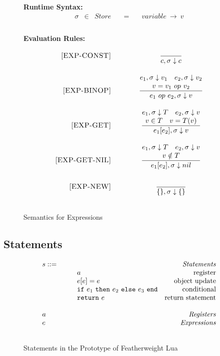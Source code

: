 \documentclass{article}
\begin{document}
\begin{figure}[H]
\caption{Semantics for Expressions}
{\bf Runtime Syntax:}
\label{fig:ExpSem}
\[
\begin{array}{rclcl}
  \sigma & \in & {Store} \quad  & = & \quad {variable} ~\rightarrow ~v \\
  \\
\end{array}
\]

{\bf Evaluation Rules:~~~ } \\
\[
\begin{array}{r@{\qquad\qquad}c}
\ssrule{EXP-CONST}{
}{
  \semanticExp{c}{\sigma}{c}
}
\ssrule{EXP-BINOP}{
  \semanticExp{e_1}{\sigma}{v_1} \quad
  \semanticExp{e_2}{\sigma}{v_2} \\
  v = v_1 ~op~ v_2
}{
  \semanticExp{e_1 ~op~ e_2}{\sigma}{v}
}
\ssrule{EXP-GET}{
  \semanticExp{e_1}{\sigma}{T} \quad
  \semanticExp{e_2}{\sigma}{v} \\
  v \in T \quad
  v = T(v)
}{
  \semanticExp{e_1[e_2]}{\sigma}{v}
}
\ssrule{EXP-GET-NIL}{
  \semanticExp{e_1}{\sigma}{T} \quad
  \semanticExp{e_2}{\sigma}{v} \\
  v \notin T 
}{
  \semanticExp{e_1[e_2]}{\sigma}{nil}
}
\ssrule{EXP-NEW}{
}{
  \semanticExp{\{\}}{\sigma}{\{\}}
}
\end{array}
\]
\end{figure}


\subsection{Statements}



\begin{figure}
\caption{Statements in the Prototype of Featherweight Lua}
\label{fig:FWLuaStat}
\[
\begin{array}{llr}
  \mydefhead{s ::=\qquad\qquad\qquad\qquad}{Statements}
  \mydefcase{a}{register}
  \mydefcase{e[e] = e}{object update}
  \mydefcase{\ife {e_1} {e_2} {e_3}}{conditional}
  \mydefcase{{\tt return} ~e}{return statement}
  \\
  \mydefhead{a \qquad\qquad\qquad\qquad}{Registers}
  \mydefhead{e \qquad\qquad\qquad\qquad}{Expressions}
  \\
\end{array}
\]
\end{figure}
\end{document}
